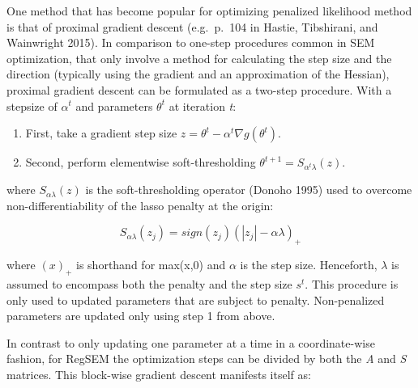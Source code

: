 \documentclass[article]{jss}
\begin{document}
One method that has become popular for optimizing penalized likelihood
method is that of proximal gradient descent (e.g.~p.~104 in Hastie,
Tibshirani, and Wainwright 2015). In comparison to one-step procedures
common in SEM optimization, that only involve a method for calculating
the step size and the direction (typically using the gradient and an
approximation of the Hessian), proximal gradient descent can be
formulated as a two-step procedure. With a stepsize of \(\alpha^{t}\)
and parameters \(\theta^{t}\) at iteration \textit{t}:

\begin{enumerate}
    \item First, take a gradient step size $z = \theta^{t} - \alpha^{t} \nabla g(\theta^{t})$.
    \item Second, perform elementwise soft-thresholding $\theta^{t+1} = S_{\alpha^{t} \lambda}(z)$.
\end{enumerate}

where \(S_{\alpha \lambda}(z)\) is the soft-thresholding operator
(Donoho 1995) used to overcome non-differentiability of the lasso
penalty at the origin:

\begin{equation}
S_{\alpha \lambda}(z_{j}) = sign(z_{j})(|z_{j}|-\alpha \lambda)_{+}
\end{equation}

where \((x)_{+}\) is shorthand for max(x,0) and \(\alpha\) is the step
size. Henceforth, \(\lambda\) is assumed to encompass both the penalty
and the step size \(s^{t}\). This procedure is only used to updated
parameters that are subject to penalty. Non-penalized parameters are
updated only using step 1 from above.

In contrast to only updating one parameter at a time in a
coordinate-wise fashion, for RegSEM the optimization steps can be
divided by both the \textit{A} and \textit{S} matrices. This block-wise
gradient descent manifests itself as:

\noindent
\end{document}
